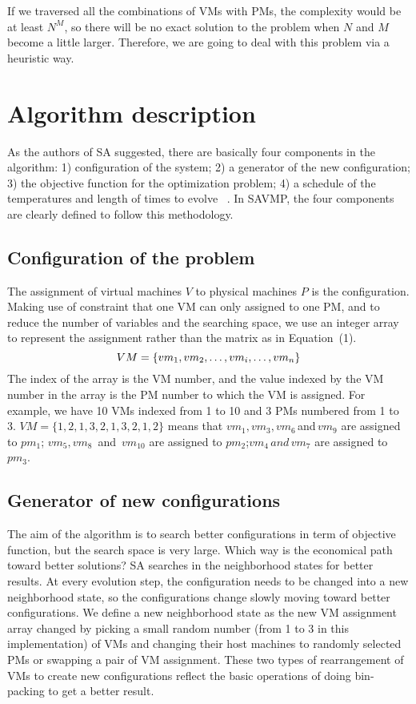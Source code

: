 \documentclass[10pt, conference, compsocconf]{IEEEtran}
\begin{document}
If we traversed all the combinations of VMs with PMs, the complexity would be at
least $N^M$, so there will be no exact solution to the problem when $N$ and $M$
become a little larger. Therefore, we are going to deal with this problem via a
heuristic way.

\section{Algorithm description}

As the authors of SA suggested, there are basically four components in the
algorithm: 1) configuration of the system; 2) a generator of the new
configuration; 3) the objective function for the optimization problem; 4) a
schedule of the temperatures and length of times to evolve
~\cite{kirkpatrick83}. In SAVMP, the four components are clearly defined to
follow this methodology.

\subsection{Configuration of the problem}
The assignment of virtual machines $V$ to physical machines $P$ is the
configuration. Making use of constraint that one VM can only assigned to one PM,
and to reduce the number of variables and the searching space, we use an integer
array to represent the assignment rather than the matrix as in Equation~(1). 
\begin{equation}\label{10}
VM=\{vm_1,vm_2,\ldots,vm_i,\ldots,vm_{n}\} \\
\end{equation}
The index of the array is the VM number, and the value indexed by the VM number
in the array is the PM number to which the VM is assigned. For example, we have
10 VMs indexed from 1 to 10 and 3 PMs numbered from 1 to 3.
$VM=\{1,2,1,3,2,1,3,2,1,2\}$ means that $vm_1,vm_3,vm_6 \, $and$ \, vm_9$ are
assigned to $pm_1$; $vm_5,vm_8 \,$ and $\, vm_{10}$ are assigned to $pm_2$;$vm_4
\, and \, vm_7$ are assigned to $pm_3$.

\subsection{Generator of new configurations }
The aim of the algorithm is to search better configurations in term of objective
function, but the search space is very large. Which way is the economical path
toward better solutions? SA searches in the neighborhood states for
better results. At every evolution step, the configuration needs to be changed
into a new neighborhood state, so the configurations change slowly moving toward
better configurations. We define a new neighborhood state as the new VM
assignment array changed by picking a small random number (from 1 to 3 in this
implementation) of VMs and changing their host machines to randomly selected PMs
or swapping a pair of VM assignment.
These two types of rearrangement of VMs to create new configurations reflect the
basic operations of doing bin-packing to get a better result.
\end{document}
